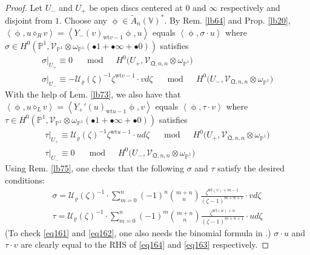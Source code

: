 \documentclass[11pt,b5paper,notitlepage]{article}
\theoremstyle{definition}
\theoremstyle{plain}
\newcommand{\mc}{\mathcal}
\newcommand{\wtd}{\widetilde}
\newcommand{\scr}{\mathscr}
\newcommand{\blt}{\bullet}
\newcommand{\Vbb}{\mathbb V}
\newcommand{\Pbb}{\mathbb P}
\newcommand{\wt}{\mathrm{wt}}
\newcommand{\<}{\left\langle}
\renewcommand{\>}{\right\rangle}
\newcommand{\fq}{{\mathfrak Q}}
\numberwithin{equation}{section}
\begin{document}
\begin{proof}
Let $U_-$ and $U_+$ be open discs centered at $0$ and $\infty$ respectively and disjoint from $1$. Choose any $\upphi\in\wtd A_n(\Vbb)^*$. By Rem. \ref{lb64} and Prop. \ref{lb20}, $\<\upphi,u\diamond_R v\>=\<Y_-(v)_{\wt v-1}\upphi,u\>$ equals $\<\upphi,\sigma\cdot u\>$ where $\sigma\in H^0(\Pbb^1,\scr V_{\Pbb^1}\otimes\omega_{\Pbb^1}(\blt 1+\blt\infty+\blt 0))$ satisfies
\begin{subequations}
\begin{gather}
\sigma\big|_{U_+}\equiv 0\quad\mod\quad H^0\big(U_+,\scr V_{\fq,n,n}\otimes\omega_{\Pbb^1}\big)\\
\sigma\big|_{U_-}\equiv -\mc U_\varrho(\zeta)^{-1} \zeta^{\wt v-1}\cdot  v d\zeta\quad\mod\quad H^0\big(U_-,\scr V_{\fq,n,n}\otimes\omega_{\Pbb^1}\big)  \label{eq161}
\end{gather}
\end{subequations}
With the help of Lem. \ref{lb73}, we also have that $\<\upphi,u\diamond_L v\>=\<Y_+'(u)_{\wt u-1}\upphi,v\>$ equals $\<\upphi,\tau\cdot v\>$ where $\tau\in H^0(\Pbb^1,\scr V_{\Pbb^1}\otimes\omega_{\Pbb^1}(\blt 1+\blt \infty+\blt 0))$ satisfies
\begin{subequations}
\begin{gather}
\tau\big|_{U_+}\equiv \mc U_\varrho(\zeta)^{-1} \zeta^{\wt u-1}\cdot u   d\zeta\quad\mod\quad H^0\big(U_+,\scr V_{\fq,n,n}\otimes\omega_{\Pbb^1}\big)  \label{eq162}\\
\tau\big|_{U_-}\equiv 0\quad\mod\quad H^0\big(U_-,\scr V_{\fq,n,n}\otimes\omega_{\Pbb^1}\big)
\end{gather}
\end{subequations}
Using Rem. \ref{lb75}, one checks that the following $\sigma$ and $\tau$ satisfy the desired conditions:
\begin{subequations}
\begin{gather}
\sigma=\mc U_\varrho(\zeta)^{-1}\cdot \sum_{m=0}^n(-1)^n \binom{m+n}{n}\frac{\zeta^{\wt(v)+m-1}}{(\zeta-1)^{m+n+1}} \cdot vd\zeta\\
\tau=\mc U_\varrho(\zeta)^{-1}\cdot \sum_{m=0}^n (-1)^m \binom{m+n}{n}\frac{\zeta^{\wt(u)+n}}{(\zeta-1)^{m+n+1}}\cdot ud\zeta
\end{gather}
\end{subequations}
(To check \eqref{eq161} and \eqref{eq162}, one also needs the binomial formula in \cite[Prop. 5.2]{DLM-Zhu}.) $\sigma\cdot u$ and $\tau\cdot v$ are clearly equal to the RHS of \eqref{eq164} and \eqref{eq163} respectively.
\end{proof}
\end{document}
